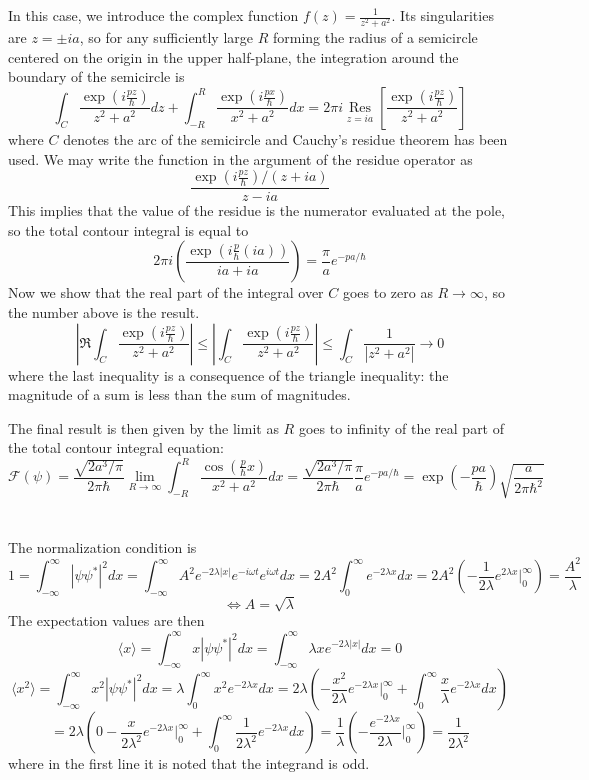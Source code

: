 \documentclass{article}
\DeclareMathOperator{\Res}{Res}
\begin{document}
In this case, we introduce the complex function $f(z)=\frac{1}{z^2+a^2}$. Its singularities are $z=\pm ia$, so for any sufficiently large $R$ forming the radius of a semicircle centered on the origin in the upper half-plane, the integration around the boundary of the semicircle is
\[\int_C\frac{\exp\left( i\frac{pz}{\hbar} \right)}{z^2+a^2}dz+\int_{-R}^R\frac{\exp\left( i\frac{px}{\hbar} \right)}{x^2+a^2}dx=2\pi i\underset{z=ia}{\Res} \left[ \frac{\exp\left( i\frac{pz}{\hbar} \right)}{z^2+a^2}\right]\]
where $C$ denotes the arc of the semicircle and Cauchy's residue theorem has been used. We may write the function in the argument of the residue operator as
\[\frac{\exp\left( i\frac{pz}{\hbar} \right)/(z+ia)}{z-ia}\]
This implies that the value of the residue is the numerator evaluated at the pole, so the total contour integral is equal to
\[2\pi i\left( \frac{\exp\left( i\frac{p}{\hbar}(ia) \right)}{ia+ia} \right)=\frac{\pi}{a}e^{-pa/\hbar}\]
Now we show that the real part of the integral over $C$ goes to zero as $R\to\infty$, so the number above is the result.
\[\left| \Re\int_C\frac{\exp\left( i\frac{pz}{\hbar} \right)}{z^2+a^2} \right|\leq \left| \int_C\frac{\exp\left( i\frac{pz}{\hbar} \right)}{z^2+a^2} \right|\leq \int_C\frac{1}{|z^2+a^2|}\to 0\]
where the last inequality is a consequence of the triangle inequality: the magnitude of a sum is less than the sum of magnitudes.

The final result is then given by the limit as $R$ goes to infinity of the real part of the total contour integral equation:
\[\mathcal{F}(\psi)=\frac{\sqrt{2a^3/\pi}}{2\pi\hbar}\lim_{R\to\infty}\int_{-R}^R\frac{\cos\left( \frac{p}{\hbar}x \right)}{x^2+a^2}dx=\frac{\sqrt{2a^3/\pi}}{2\pi\hbar}\frac{\pi}{a}e^{-pa/\hbar}=\exp\left( -\frac{pa}{\hbar} \right)\sqrt{\frac{a}{2\pi\hbar^2}}\]

\section{}
The normalization condition is
\[1=\int_{-\infty}^\infty|\psi\psi^*|^2dx=\int_{-\infty}^\infty A^2e^{-2\lambda|x|}e^{-i\omega t}e^{i\omega t}dx=2A^2\int_0^\infty e^{-2\lambda x}dx=2A^2\left( -\frac{1}{2\lambda}e^{2\lambda x}\bigg|_0^\infty \right)=\frac{A^2}{\lambda}\]
\[\Leftrightarrow A=\sqrt{\lambda}\]
The expectation values are then
\[\langle x \rangle=\int_{-\infty}^\infty x|\psi\psi^*|^2dx=\int_{-\infty}^\infty\lambda xe^{-2\lambda |x|}dx=0\]
\[\langle x^2 \rangle=\int_{-\infty}^\infty x^2|\psi\psi^*|^2dx=\lambda\int_{0}^\infty  x^2e^{-2\lambda x}dx=2\lambda\left( -\frac{x^2}{2\lambda}e^{-2\lambda x}\bigg|_0^\infty+\int_0^\infty \frac{x}{\lambda}e^{-2\lambda x}dx\right)\]
\[=2\lambda\left(0-\frac{x}{2\lambda^2}e^{-2\lambda x}\bigg|_0^\infty+\int_0^\infty\frac{1}{2\lambda^2}e^{-2\lambda x}dx \right)=\frac{1}{\lambda}\left( -\frac{e^{-2\lambda x}}{2\lambda}\bigg|_0^\infty \right)=\frac{1}{2\lambda^2}\]
where in the first line it is noted that the integrand is odd.
\end{document}
